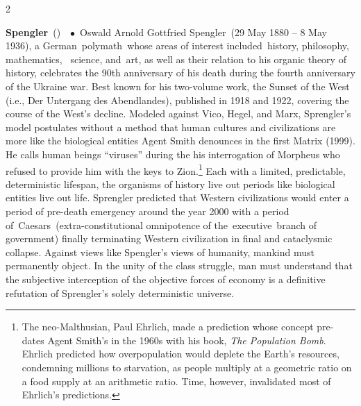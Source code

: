 \documentclass[10pt,a4paper,twoside]{article} %
\newcommand{\entry}[4]{\markboth{#1}{#1}\textbf{#1}\ {(#2)}\ \textit{#3}\ $\bullet$\ {#4}}  %
\begin{document}
\begin{multicols}{2}
{\entry{Spengler} {} {} {Oswald Arnold Gottfried Spengler (29 May 1880 – 8 May 1936), a German polymath whose areas of interest included history, philosophy,  mathematics, 
science, and art, as well as their relation to his organic theory of history, celebrates the 90th anniversary of his death during the fourth anniversary of the Ukraine war. \newline \indent Best known for his two-volume work, the Sunset of the West (i.e., Der Untergang des Abendlandes), published in 1918 and 1922, covering the course of the West’s decline. Modeled against Vico, Hegel, and Marx, Sprengler’s model postulates without a method that human cultures and civilizations are more like the biological entities Agent Smith denounces in the first Matrix (1999). He calls human beings “viruses” during the his interrogation of Morpheus who refused to provide him with the keys to Zion.\footnote{The neo-Malthusian, Paul Ehrlich, made a prediction whose concept pre-dates Agent Smith's in the 1960s with his book, \textenglish{\emph{The Population Bomb}}. Ehrlich predicted how overpopulation would deplete the Earth’s resources, condemning millions to starvation, as people multiply at a geometric ratio on a food supply at an arithmetic ratio. Time, however, invalidated most of Ehrlich's predictions.} \newline \indent Each with a limited, predictable, deterministic lifespan, the organisms of history live out periods like biological entities live out life. Sprengler predicted that Western civilizations would enter a period of pre-death emergency around the year 2000 with a period of Caesars (extra-constitutional omnipotence of the executive branch of government) finally terminating Western civilization in final and cataclysmic collapse. \newline \indent Against views like Spengler's views of humanity, mankind must permanently object. In the unity of the class struggle, man must understand that the subjective interception of the objective forces of economy is a definitive refutation of Sprengler's solely deterministic universe. 
}  


}
\end{multicols}
\end{document}
